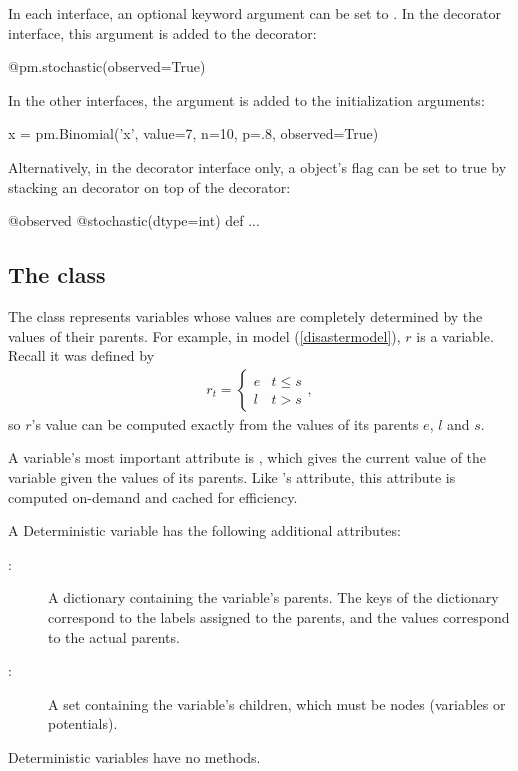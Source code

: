\documentclass[]{jss}
\begin{document}
In each interface, an optional keyword argument  can be set to . In the decorator interface, this argument is added to the  decorator:

\begin{CodeInput}
@pm.stochastic(observed=True)
\end{CodeInput}

In the other interfaces, the  argument is added to the initialization arguments:

\begin{CodeInput}
x = pm.Binomial('x', value=7, n=10, p=.8, observed=True)
\end{CodeInput}

Alternatively, in the decorator interface only, a  object's  flag can be set to true by stacking an  decorator on top of the  decorator:
\begin{CodeInput}
@observed
@stochastic(dtype=int)
    def ...
\end{CodeInput}


\subsection[The Deterministic class]{The  class}
\label{deterministic}


The  class represents variables whose values are completely determined by the values of their parents. For example, in model (\ref{disastermodel}), $r$ is a  variable. Recall it was defined by
\begin{eqnarray*}
    r_t=\left\{\begin{array}{ll}
        e & t\le s\\ l & t>s
        \end{array}\right.,
\end{eqnarray*}
so $r$'s value can be computed exactly from the values of its parents $e$, $l$ and $s$.

A  variable's most important attribute is , which gives the current value of the variable given the values of its parents. Like 's  attribute, this attribute is computed on-demand and cached for efficiency.

A Deterministic variable has the following additional attributes:
\begin{description}
    \item[:] A dictionary containing the variable's parents. The keys of the dictionary correspond to the labels assigned to the parents, and the values correspond to the actual parents.
    \item[:] A set containing the variable's children, which must be nodes (variables or potentials).
\end{description}
Deterministic variables have no methods.
\end{document}
